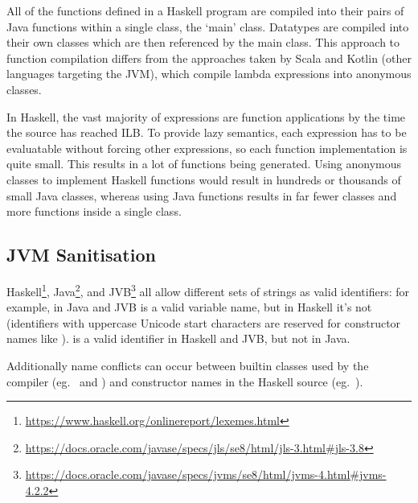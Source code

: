 \documentclass[dissertation.tex]{subfiles}
\begin{document}
{{{\begin{enumerate}
{\begin{itemize}
{                }
                \end{itemize}
            }
            \end{enumerate}

            All of the functions defined in a Haskell program are compiled into their pairs of Java functions within
            a single class, the `main' class. Datatypes are compiled into their own classes which are then
            referenced by the main class. This approach to function compilation differs from the approaches taken by
            Scala and Kotlin (other languages targeting the JVM), which compile lambda expressions into anonymous
            classes.

            In Haskell, the vast majority of expressions are function applications by the time the source has
            reached ILB. To provide lazy semantics, each expression has to be evaluatable without forcing other
            expressions, so each function implementation is quite small. This results in a lot of functions being
            generated. Using anonymous classes to implement Haskell functions would result in hundreds or thousands
            of small Java classes, whereas using Java functions results in far fewer classes and more functions
            inside a single class.

        }
    }
    \subsection{JVM Sanitisation}
    {

        Haskell\footnote{\url{https://www.haskell.org/onlinereport/lexemes.html}},
        Java\footnote{\url{https://docs.oracle.com/javase/specs/jls/se8/html/jls-3.html\#jls-3.8}}, and
        JVB\footnote{\url{https://docs.oracle.com/javase/specs/jvms/se8/html/jvms-4.html\#jvms-4.2.2}} all allow
        different sets of strings as valid identifiers: for example, in Java and JVB  is a valid variable
        name, but in Haskell it's not (identifiers with uppercase Unicode start characters are reserved for
        constructor names like ). \monospace{(+)} is a valid identifier in Haskell and JVB, but not in
        Java.

        Additionally name conflicts can occur between builtin classes used by the compiler (eg.\  and
        ) and constructor names in the Haskell source (eg.\ ).

}}
\end{document}
